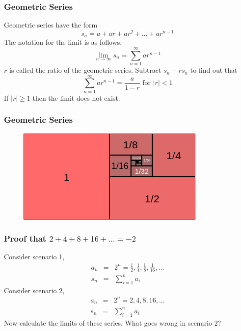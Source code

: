 \documentclass[xcolor=dvipsnames]{beamer}
\begin{document}
\begin{frame}
  \frametitle{Geometric Series}
  \alert{Geometric series} have the form
  \begin{equation}
    \label{eq:ahngahph}
    s_{n}=a+ar+ar^{2}+\ldots{}+ar^{n-1}
  \end{equation}
  The notation for the limit is as follows,
  \begin{equation}
    \label{eq:eeyengog}
    \lim_{n\rightarrow\infty}s_{n}=\sum_{n=1}^{\infty}ar^{n-1}
  \end{equation}
$r$ is called the \alert{ratio} of the geometric series. Subtract
$s_{n}-rs_{n}$ to find out that
\begin{equation}
  \label{eq:seciefai}
  \sum_{n=1}^{\infty}ar^{n-1}=\frac{a}{1-r}\mbox{ for }\vert{}r\vert{}<1
\end{equation}
If $\vert{}r\vert{}\geq{}1$ then the limit does not exist.
\end{frame}

\begin{frame}
  \frametitle{Geometric Series}
  \begin{figure}[h]
    \includegraphics[scale=0.7]{./diagrams/geoser.png}
  \end{figure}
\end{frame}

\begin{frame}
  \frametitle{Proof that $2+4+8+16+\ldots{}=-2$}
  Consider scenario 1,
  \begin{equation}
    \label{eq:oobeecho}
    \begin{array}{rcl}
      a_{n}&=&2^{n}=\frac{1}{2},\frac{1}{4},\frac{1}{8},\frac{1}{16},\ldots \\
      s_{n}&=&\sum_{i=1}^{n}a_{i}
    \end{array}
  \end{equation}
  Consider scenario 2,
  \begin{equation}
    \label{eq:ohjaihen}
    \begin{array}{rcl}
      a_{n}&=&2^{n}=2,4,8,16,\ldots \\
      s_{n}&=&\sum_{i=1}^{n}a_{i}
    \end{array}
  \end{equation}
  Now calculate the limits of these series. What goes wrong in
  scenario 2?
\end{frame}
\end{document}
